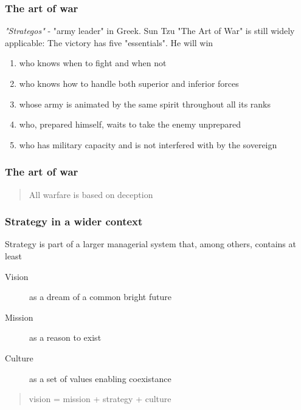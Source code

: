 \begin{frame}[fragile]
  \frametitle{The art of war}
  \emph{"Strategos"} - "army leader" in Greek. Sun Tzu "The Art of War" \citep{tzu2013art} is still widely applicable:
	The victory has five "essentials". He will win 
   \begin{enumerate}
   		\item who knows when to fight and when not
		\item who knows how to handle both superior and inferior forces
		\item whose army is animated by the same spirit throughout all its ranks
		\item who, prepared himself, waits to take the enemy unprepared
		\item who has military capacity and is not interfered with by the sovereign 
   \end{enumerate}
\end{frame}

\begin{frame}[fragile]
  \frametitle{The art of war}
  \begin{quote}
    All warfare is based on deception
  \end{quote}

\end{frame}

\begin{frame}[fragile]
  \frametitle{Strategy in a wider context}
  Strategy is part of a larger managerial system that, among others, contains at least
  	\begin{description}
		\item[Vision] as a dream of a common bright future
		\item[Mission] as a reason to exist
		\item[Culture] as a set of values enabling coexistance
	\end{description}	
	\begin{quote}
	vision = mission + strategy + culture \end{quote}\citep{lipton1996demystifying}
\end{frame}


